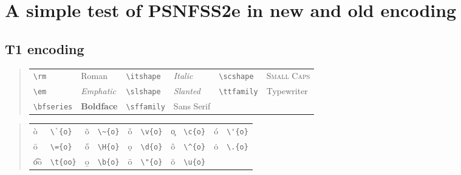 \documentclass{article}
\begin{document}
\section*{A simple test of PSNFSS2e in new and old encoding}

\subsection*{T1 encoding}

\begin{quote}\begin{tabular}{|ll|ll|ll|}\hline
\verb|\rm|   & \rm Roman         & \verb|\itshape|   & \itshape Italic
                                  & \verb|\scshape|   & \scshape Small Caps    \\
\verb|\em|   & \em Emphatic      & \verb|\slshape| & \slshape Slanted
                                  & \verb|\ttfamily|   & \ttfamily Typewriter     \\
\verb|\bfseries|   & \bfseries Boldface      & \verb|\sffamily| & \sffamily Sans Serif & &
\\ \hline
\end{tabular}\end{quote}

\begin{quote}\begin{tabular}{|*{5}{ll|}}\hline
\`{o} & \verb|\`{o}|  & \~{o}  & \verb|\~{o}|  & \v{o}  & \verb|\v{o}| &
\c{o}  & \verb|\c{o}|  & \'{o} & \verb|\'{o}|  \\
\={o} & \verb|\={o}|  & \H{o}  & \verb|\H{o}| & \d{o}  & \verb|\d{o}| &
\^{o}  & \verb|\^{o}|  & \.{o}  & \verb|\.{o}|  \\
\t{oo} & \verb|\t{oo}| & \b{o}  & \verb|\b{o}| & \"{o} & \verb|\"{o}| &
\u{o}  & \verb|\u{o}|  && \\ \hline
\end{tabular}\end{quote}
\end{document}
